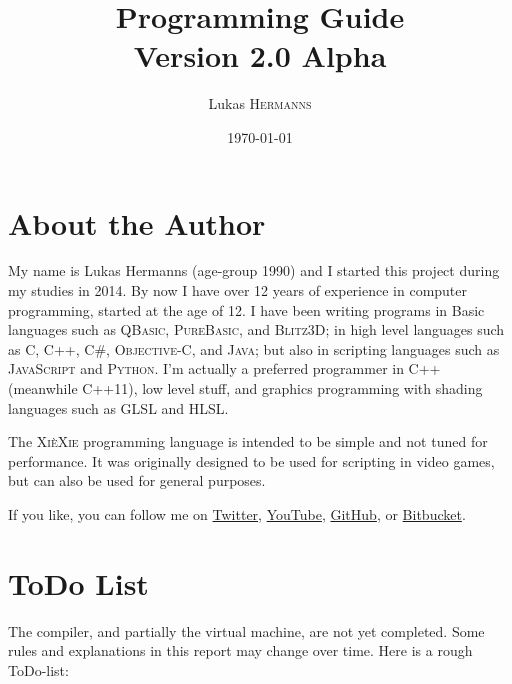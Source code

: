\documentclass{report}
\title{\xiexie Programming Guide \\ {\normalsize Version 2.0 Alpha}}
\author{Lukas \textsc{Hermanns}}
\date{\today}
\def\xiexie{\textsc{Xi\`eXie}\xspace}
\def\xxlang{\xiexie programming language\xspace}
\def\cppx{\textsc{C++11}\xspace}
\begin{document}
\maketitle



\chapter*{About the Author}

My name is Lukas Hermanns (age-group 1990) and I started this project during my studies in 2014.
By now I have over 12 years of experience in computer programming, started at the age of 12.
I have been writing programs in Basic languages such as \textsc{QBasic}, \textsc{PureBasic}, and \textsc{Blitz3D};
in high level languages such as \textsc{C}, \textsc{C++}, \textsc{C\#}, \textsc{Objective-C}, and \textsc{Java};
but also in scripting languages such as \textsc{JavaScript} and \textsc{Python}.
I'm actually a preferred programmer in C++ (meanwhile \cppx), low level stuff, and graphics programming
with shading languages such as GLSL and HLSL.

The \xxlang is intended to be simple and not tuned for performance.
It was originally designed to be used for scripting in video games, but can also be used for
general purposes.

If you like, you can follow me on \href{https://twitter.com/LukasBanana}{Twitter},
\href{https://www.youtube.com/user/SoftPixel}{YouTube}, \href{https://github.com/LukasBanana}{GitHub},
or \href{https://bitbucket.org/LukasBanana}{Bitbucket}.


\chapter*{ToDo List}

The compiler, and partially the virtual machine, are not yet completed. Some rules and explanations in this report
may change over time. Here is a rough ToDo-list:
\end{document}
